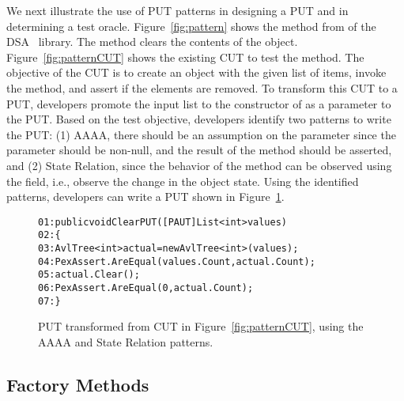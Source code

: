 We next illustrate the use of PUT patterns in designing a PUT and in determining a test oracle. Figure~\ref{fig:pattern} shows the  method from  of the DSA~\cite{dsa} library. The  method clears the contents of the  object. Figure~\ref{fig:patternCUT} shows the existing CUT to test the  method. The objective of the CUT is to create an  object with the given list of items, invoke the  method, and assert if the elements are removed. To transform this CUT to a PUT, developers promote the input list to the constructor of  as a parameter to the PUT. Based on the test objective, developers identify two patterns to write the PUT: (1) AAAA, there should be an assumption on the parameter since the parameter should be non-null, and the result of the  method should be asserted, and (2) State Relation, since the behavior of the  method can be observed using the  field, i.e., observe the change in the object state. Using the identified patterns, developers can write a PUT shown in Figure~\ref{fig:patternPUT}. 

\begin{figure}
\begin{CodeOut}        
\begin{alltt}
01: public void ClearPUT([PAUT]List<int> values)
02: \{
03: \hspace{0.07in}AvlTree<int> actual = new AvlTree<int>(values);
04: \hspace{0.07in}PexAssert.AreEqual(values.Count, actual.Count);
05: \hspace{0.07in}actual.Clear();
06: \hspace{0.07in}PexAssert.AreEqual(0, actual.Count);
07: \}
\end{alltt}
\end{CodeOut}\vspace*{-4ex}
\caption{PUT transformed from CUT in Figure~\ref{fig:patternCUT}, using the AAAA and State Relation patterns.}%
\label{fig:patternPUT}%
\end{figure}

\subsection{Factory Methods}
\label{sec:factory}

